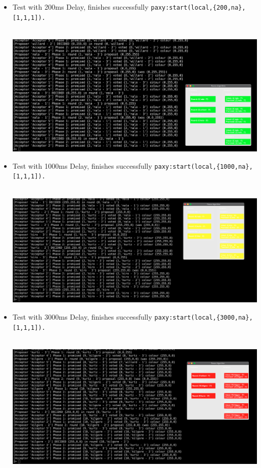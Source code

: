 \documentclass[a4paper, 10pt]{article}
\begin{document}
\begin{itemize}
\item Test with 200ms Delay, finishes successfully \lstinline|paxy:start(local,{200,na},[1,1,1]).|\\\\
\begin{minipage}[t]{\linewidth}
    \includegraphics[width=\textwidth]{delay200ms}
\end{minipage}
\item Test with 1000ms Delay, finishes successfully \lstinline|paxy:start(local,{1000,na},[1,1,1]).|\\\\
\begin{minipage}[t]{\linewidth}
    \includegraphics[width=\textwidth]{delay1000ms}
\end{minipage}
\item Test with 3000ms Delay, finishes successfully \lstinline|paxy:start(local,{3000,na},[1,1,1]).|\\\\
\begin{minipage}[t]{\linewidth}
    \includegraphics[width=\textwidth]{delay3000ms}

\end{minipage}
\end{itemize}
\end{document}
